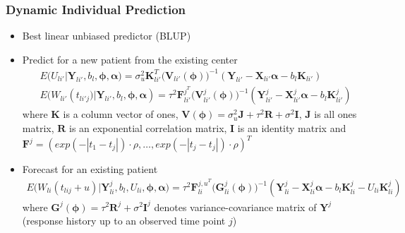\documentclass[fleqn]{beamer}
\begin{document}
\begin{frame}
\frametitle{Dynamic Individual Prediction}
\footnotesize
\begin{itemize}
    \item Best linear unbiased predictor (BLUP)
    \item Predict for a new patient from the existing center
    \begin{align}
   & E\big(U_{li'}|\bm{Y}_{li'},b_l, \bm{\phi},\bm{\alpha}\big)  = \sigma_u^2\bm{K}^T_{li'}\big(\bm{V}_{li'}(\bm{\phi})\big)^{-1} (\bm{Y}_{li'}-\bm{X}_{li'}\bm{\alpha}-b_l\bm{K}_{li'})\label{chp2:eq4} \\
   & E\big(W_{li'}(t_{li'j}\big)|\bm{Y}_{li'},b_l, \bm{\phi},\bm{\alpha})  =  \tau^2\bm{F}^{j^T}_{li'}\big(\bm{V}^j_{li'}(\bm{\phi})\big)^{-1}  (\bm{Y}^j_{li'}-\bm{X}^{j}_{li'}\bm{\alpha}-b_l\bm{K}^j_{li'}) 
\end{align}
\scriptsize
where $\bm{K}$ is a column vector of ones, $\bm{V}(\bm{\phi})=\sigma_u^2\bm{J}+\tau^2\bm{R}+\sigma^2\bm{I}$, $\bm{J}$ is all ones matrix, $\bm{R}$ is an exponential correlation matrix, $\bm{I}$ is an identity matrix and $\bm{F}^j=(exp(-|t_1-t_j|) \cdot \rho,\dots,exp(-|t_j-t_j|) \cdot \rho)^T$

\footnotesize
\item Forecast for an existing patient
\begin{align}
  E\big(W_{li}(t_{lij}+u)|\bm{Y}^j_{li},b_l, U_{li},\bm{\phi}, \bm{\alpha}\big)  =  \tau^2\bm{F}^{{j,u}^T}_{li}\big(\bm{G}^j_{li}(\bm{\phi})\big)^{-1}(\bm{Y}^j_{li}-\bm{X}^{j}_{li}\bm{\alpha}-b_l\bm{K}^j_{li}-U_{li}\bm{K}^j_{li}) 
\end{align}
\scriptsize
where $\bm{G}^j(\bm{\phi})=\tau^2\bm{R}^j+\sigma^2\bm{I}^j$ denotes variance-covariance matrix of $\bm{Y}^j$ (response history up to an observed time point $j$)

\end{itemize}


\end{frame}
\end{document}
